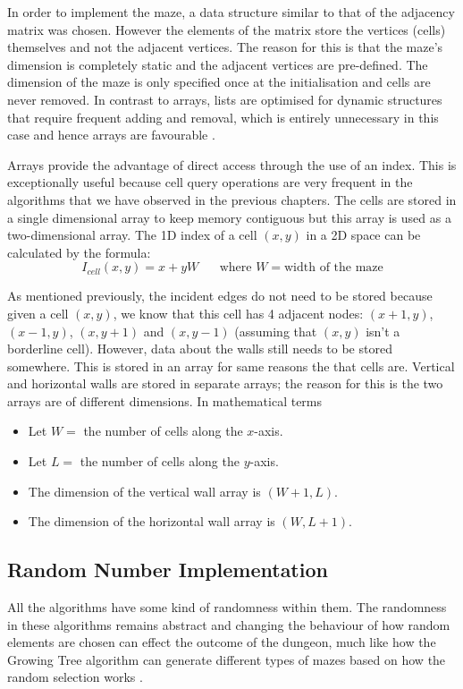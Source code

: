In order to implement the maze, a data structure similar to that of the adjacency matrix was chosen. However the elements of the matrix store the vertices (cells) themselves and not the adjacent vertices. The reason for this is that the maze's dimension is completely static and the adjacent vertices are pre-defined. The dimension of the maze is only specified once at the initialisation and cells are never removed. In contrast to arrays, lists are optimised for dynamic structures that require frequent adding and removal, which is entirely unnecessary in this case and hence arrays are favourable \citep{DSAJ-4}. 

Arrays provide the advantage of direct access through the use of an index. This is exceptionally useful because cell query operations are very frequent in the algorithms that we have observed in the previous chapters. The cells are stored in a single dimensional array to keep memory contiguous but this array is used as a two-dimensional array. The 1D index of a cell $(x,y)$ in a 2D space can be calculated by the formula:
$$ I_{cell}(x,y) = x + yW \;\;\;\;\;\; \text{where }W=\text{width of the maze} $$

As mentioned previously, the incident edges do not need to be stored because given a cell $(x, y)$, we know that this cell has 4 adjacent nodes: $(x+1,y)$, $(x-1,y)$, $(x,y+1)$ and $(x,y-1)$ (assuming that $(x, y)$ isn't a borderline cell). However, data about the walls still needs to be stored somewhere. This is stored in an array for same reasons the that cells are. Vertical and horizontal walls are stored in separate arrays; the reason for this is the two arrays are of different dimensions. In mathematical terms
\begin{itemize}
\item Let $W=$ the number of cells along the $x$-axis.
\item Let $L=$ the number of cells along the $y$-axis.
\item The dimension of the vertical wall array is $(W+1,L)$.
\item The dimension of the horizontal wall array is $(W,L+1)$.
\end{itemize}

\subsection{Random Number Implementation}
All the algorithms have some kind of randomness within them. The randomness in these algorithms remains abstract and changing the behaviour of how random elements are chosen can effect the outcome of the dungeon, much like how the Growing Tree algorithm can generate different types of mazes based on how the random selection works \citep{ThinkLabyrinth}.

